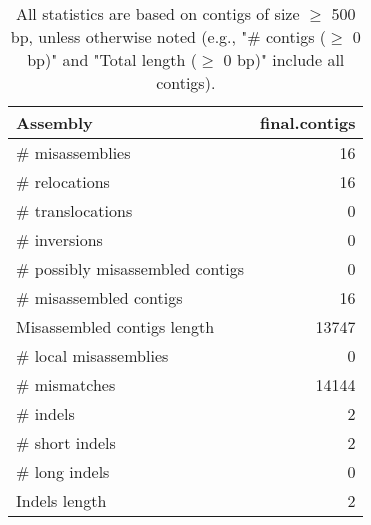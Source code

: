\documentclass[12pt,a4paper]{article}
\begin{document}
\begin{table}[ht]
\begin{center}
\caption{All statistics are based on contigs of size $\geq$ 500 bp, unless otherwise noted (e.g., "\# contigs ($\geq$ 0 bp)" and "Total length ($\geq$ 0 bp)" include all contigs).}
\begin{tabular}{|l*{1}{|r}|}
\hline
Assembly & final.contigs \\ \hline
\# misassemblies & 16 \\ \hline
\hspace{5mm}\# relocations & 16 \\ \hline
\hspace{5mm}\# translocations & 0 \\ \hline
\hspace{5mm}\# inversions & 0 \\ \hline
\# possibly misassembled contigs & 0 \\ \hline
\# misassembled contigs & 16 \\ \hline
Misassembled contigs length & 13747 \\ \hline
\# local misassemblies & 0 \\ \hline
\# mismatches & 14144 \\ \hline
\# indels & 2 \\ \hline
\hspace{5mm}\# short indels & 2 \\ \hline
\hspace{5mm}\# long indels & 0 \\ \hline
Indels length & 2 \\ \hline
\end{tabular}
\end{center}
\end{table}
\end{document}
